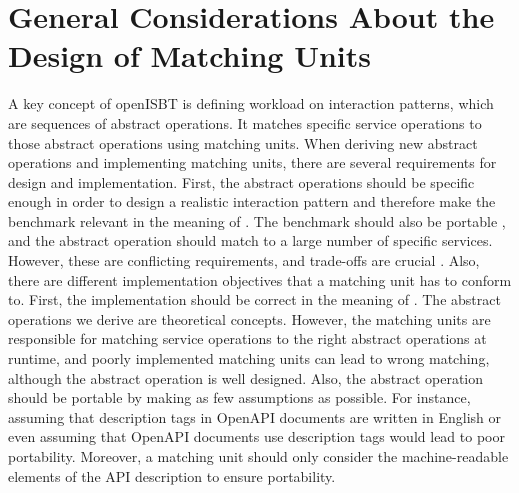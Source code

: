 \section{General Considerations About the Design of Matching Units}
\label{sec:extending:general_considerations}

A key concept of openISBT is defining workload on interaction patterns, which are sequences of abstract operations. It matches specific service operations to those abstract operations using matching units. When deriving new abstract operations and implementing matching units, there are several requirements for design and implementation. First, the abstract operations should be specific enough in order to design a realistic interaction pattern and therefore make the benchmark relevant in the meaning of \cite[][p. 38]{Bermbach_Cloud_Service_Benchmarking_2017}. The benchmark should also be portable  \cite[][p. 38]{Bermbach_Cloud_Service_Benchmarking_2017}, and the abstract operation should match to a large number of specific services. However, these are conflicting requirements, and trade-offs are crucial \cite[][p. 43-44]{Bermbach_Cloud_Service_Benchmarking_2017}. 
Also, there are different implementation objectives that a matching unit has to conform to. First, the implementation should be correct in the meaning of \cite[][p. 38]{Bermbach_Cloud_Service_Benchmarking_2017}. The abstract operations we derive are theoretical concepts.
However, the matching units are responsible for matching service operations to the right abstract operations at runtime, and poorly implemented matching units can lead to wrong matching, although the abstract operation is well designed. Also, the abstract operation should be portable \cite[][p. 81-82]{Bermbach_Cloud_Service_Benchmarking_2017} by making as few assumptions as possible. For instance, assuming that description tags in OpenAPI documents are written in English or even assuming that OpenAPI documents use description tags would lead to poor portability. Moreover, a matching unit should only consider the machine-readable elements of the API description to ensure portability.